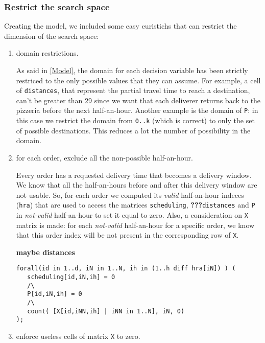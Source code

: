 \documentclass[10pt]{article}
\begin{document}
	\subsubsection{Restrict the search space}
	\label{subsubsec:restrict-search-space}
	Creating the model, we included some easy euristichs that can restrict the dimension
	of the search space:

	\begin{enumerate}

		\item domain restrictions.
		
		As said in \cref{Model}, the domain for each decision variable has been
		strictly restriced to the only possible values that they can assume. 
		For example, a cell of \texttt{distances}, that represent the partial travel time
		to reach a destination, can't be greater than 29 since we want that each deliverer 
		returns back to the pizzeria before the next half-an-hour. Another example is the domain
		of \texttt{P}: in this case we restrict the domain from \texttt{0..k} (which is correct) 
		to only the set of possible destinations. This reduces a lot the number of possibility in 
		the domain. 

		\item for each order, exclude all the non-possible half-an-hour.
		
		Every order has a requested delivery time that becomes a delivery window. 
		We know that all the half-an-hours before and after this delivery window
		are not usable. So, for each order we computed its \textit{valid} half-an-hour 
		indeces (\texttt{hra}) that are used to access the matrices \texttt{scheduling}, \textbf{???}\texttt{distances} 
		and \texttt{P} in \textit{not-valid} half-an-hour to set it equal to zero.   
		Also, a consideration on \texttt{X} matrix is made: for each \textit{not-valid} 
		half-an-hour for a specific order, we know that this order index will be not present
		in the corresponding row of \texttt{X}.

		\textbf{maybe distances}

		\begin{verbatim}
forall(id in 1..d, iN in 1..N, ih in (1..h diff hra[iN]) ) (
   scheduling[id,iN,ih] = 0
   /\
   P[id,iN,ih] = 0
   /\
   count( [X[id,iNN,ih] | iNN in 1..N], iN, 0)
);
		\end{verbatim}

		\item enforce useless cells of matrix \texttt{X} to zero.
		

\end{enumerate}
\end{document}

